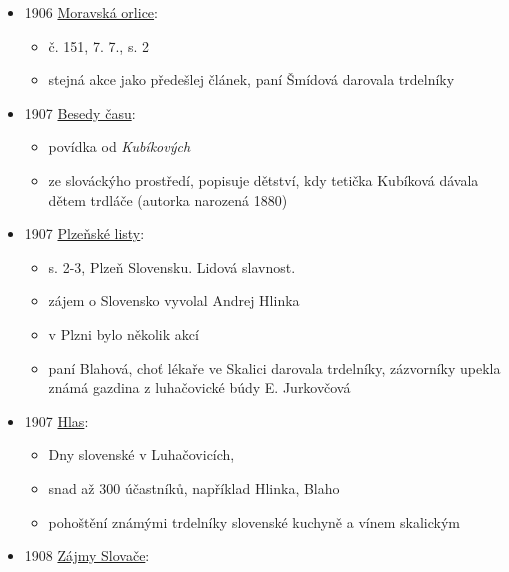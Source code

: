 \begin{itemize}
  \begin{itemize}
  \tightlist
  \item
    č. 194, 16. 7., s. 6
  \item
    odbor Národní jednoty pořádal v černohorské pivnici zahradní zábavu
    ve prospěch mateřské školy na Reicheltově ulici
  \item
    za vydražené trdelníky utržili 6 korun
  \end{itemize}
\item
  1906
  \href{https://www.digitalniknihovna.cz/mzk/uuid/uuid:9636c360-0b1e-11df-886e-000d606f5dc6}{Moravská
  orlice}:

  \begin{itemize}
  \tightlist
  \item
    č. 151, 7. 7., s. 2
  \item
    stejná akce jako předešlej článek, paní Šmídová darovala trdelníky
  \end{itemize}
\item
  1907
  \href{https://ceskadigitalniknihovna.cz/uuid/uuid:9a11a910-6d75-11e8-be68-5ef3fc9bb22f}{Besedy
  času}:

  \begin{itemize}
  \tightlist
  \item
    povídka od  \emph{Kubíkových}
  \item
    ze slováckýho prostředí, popisuje dětství, kdy tetička Kubíková
    dávala dětem trdláče (autorka narozená 1880)
  \end{itemize}
\item
  1907
  \href{https://www.digitalniknihovna.cz/svkpk/uuid/uuid:b35de670-d536-11df-b4db-000d606f5dc6}{Plzeňské
  listy}:

  \begin{itemize}
  \tightlist
  \item
    s. 2-3, Plzeň Slovensku. Lidová slavnost.
  \item
    zájem o Slovensko vyvolal Andrej Hlinka
  \item
    v Plzni bylo několik akcí
  \item
    paní Blahová, choť lékaře ve Skalici darovala trdelníky, zázvorníky
    upekla známá gazdina z luhačovické búdy E. Jurkovčová
  \end{itemize}
\item
  1907
  \href{https://www.digitalniknihovna.cz/vkol/uuid/uuid:884643bd-3622-4760-afbe-42ea8dc1487e}{Hlas}:

  \begin{itemize}
  \tightlist
  \item
    Dny slovenské v Luhačovicích, 
  \item
    snad až 300 účastníků, například Hlinka, Blaho
  \item
    pohoštění známými trdelníky slovenské kuchyně a vínem skalickým
  \end{itemize}
\item
  1908
  \href{https://www.digitalniknihovna.cz/vkol/uuid/uuid:a552abeb-9246-4f30-a5a8-c78f801aeb7d}{Zájmy
  Slovače}:


\end{itemize}
